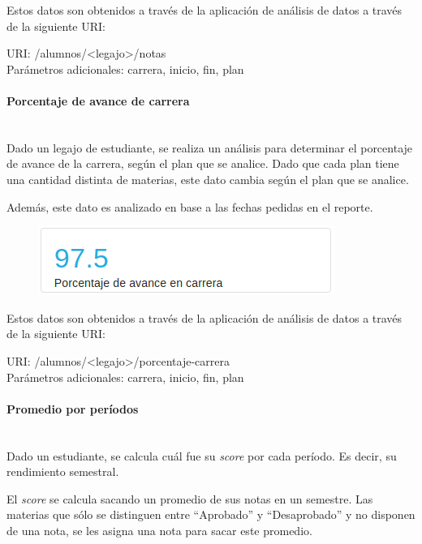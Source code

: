 Estos datos son obtenidos a través de la aplicación de análisis de datos a través de la siguiente URI:

URI: /alumnos/<legajo>/notas \\

Parámetros adicionales: carrera, inicio, fin, plan \\

\paragraph{Porcentaje de avance de carrera}\mbox{}\\

Dado un legajo de estudiante, se realiza un análisis para determinar el porcentaje de avance de la carrera, según el plan que se analice. Dado que cada plan tiene una cantidad distinta de materias, este dato cambia según el plan que se analice.

Además, este dato es analizado en base a las fechas pedidas en el reporte.

\begin{figure}[H]
  \centering
    \includegraphics[scale=0.4]{images/seguimiento-academico/sa-porcentajeavance.png}
  \label{fig:sa-porcentajeavance}
\end{figure}

Estos datos son obtenidos a través de la aplicación de análisis de datos a través de la siguiente URI:

URI: /alumnos/<legajo>/porcentaje-carrera \\

Parámetros adicionales: carrera, inicio, fin, plan \\



\paragraph{Promedio por períodos}\mbox{}\\

Dado un estudiante, se calcula cuál fue su \textit{score} por cada período. Es decir, su rendimiento semestral. 

El \textit{score} se calcula sacando un promedio de sus notas en un semestre. Las materias que sólo se distinguen entre “Aprobado” y “Desaprobado” y no disponen de una nota, se les asigna una nota para sacar este promedio.

